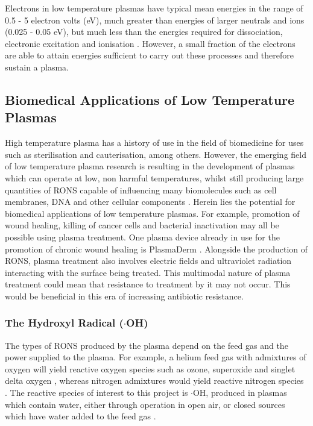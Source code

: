 \documentclass[11pt, oneside]{article}   	%
\begin{document}
Electrons in low temperature plasmas have typical mean energies in the range of 0.5 - 5 electron volts (eV), much greater than energies of larger neutrals and ions (0.025 - 0.05 eV), but much less than the energies required for dissociation, electronic excitation and ionisation \cite{Christophorou2012}.
However, a small fraction of the electrons are able to attain energies sufficient to carry out these processes and therefore sustain a plasma.

\subsection{Biomedical Applications of Low Temperature Plasmas}

High temperature plasma has a history of use in the field of biomedicine for uses such as sterilisation and cauterisation, among others.
However, the emerging field of low temperature plasma research is resulting in the development of plasmas which can operate at low, non harmful temperatures, whilst still producing large quantities of RONS capable of influencing many biomolecules such as cell membranes, DNA and other cellular components \cite{Graves2012the, Hirst2015}.
Herein lies the potential for biomedical applications of low temperature plasmas.
For example, promotion of wound healing, killing of cancer cells and bacterial inactivation may all be possible using plasma treatment.
One plasma device already in use for the promotion of chronic wound healing is PlasmaDerm \cite{BrehmerHD2015}.
Alongside the production of RONS, plasma treatment also involves electric fields and ultraviolet radiation interacting with the surface being treated.
This multimodal nature of plasma treatment could mean that resistance to treatment by it may not occur. 
This would be beneficial in this era of increasing antibiotic resistance.



\subsubsection{The Hydroxyl Radical ($\cdot$OH)} \label{sec:HydroxylRadical}

The types of RONS produced by the plasma depend on the feed gas and the power supplied to the plasma.
For example, a helium feed gas with admixtures of oxygen will yield reactive oxygen species such as ozone, superoxide and singlet delta oxygen \cite{SousaNCAGO2011}, whereas nitrogen admixtures would yield reactive nitrogen species \cite{Wagenaars2012}. 
The reactive species of interest to this project is $\cdot$OH, produced in plasmas which contain water, either through operation in open air, or closed sources which have water added to the feed gas \cite{Schroter2015atomic}.
\end{document}
